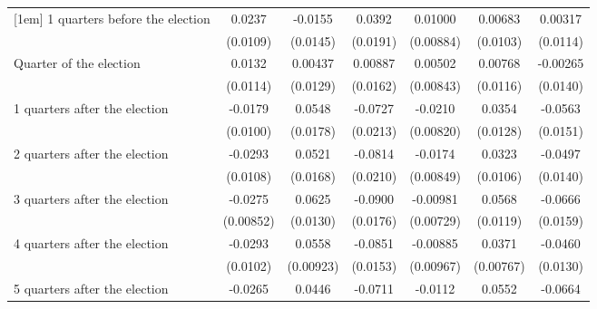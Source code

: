 \begin{table}[htbp]
\begin{tabular}{l*{6}{c}}
[1em]
 1 quarters before the election&      0.0237\sym{*}  &     -0.0155         &      0.0392\sym{*}  &     0.01000         &     0.00683         &     0.00317         \\
                    &    (0.0109)         &    (0.0145)         &    (0.0191)         &   (0.00884)         &    (0.0103)         &    (0.0114)         \\
[1em]
Quarter of the election&      0.0132         &     0.00437         &     0.00887         &     0.00502         &     0.00768         &    -0.00265         \\
                    &    (0.0114)         &    (0.0129)         &    (0.0162)         &   (0.00843)         &    (0.0116)         &    (0.0140)         \\
[1em]
 1 quarters after the election&     -0.0179         &      0.0548\sym{**} &     -0.0727\sym{***}&     -0.0210\sym{*}  &      0.0354\sym{**} &     -0.0563\sym{***}\\
                    &    (0.0100)         &    (0.0178)         &    (0.0213)         &   (0.00820)         &    (0.0128)         &    (0.0151)         \\
[1em]
 2 quarters after the election&     -0.0293\sym{**} &      0.0521\sym{**} &     -0.0814\sym{***}&     -0.0174\sym{*}  &      0.0323\sym{**} &     -0.0497\sym{***}\\
                    &    (0.0108)         &    (0.0168)         &    (0.0210)         &   (0.00849)         &    (0.0106)         &    (0.0140)         \\
[1em]
 3 quarters after the election&     -0.0275\sym{**} &      0.0625\sym{***}&     -0.0900\sym{***}&    -0.00981         &      0.0568\sym{***}&     -0.0666\sym{***}\\
                    &   (0.00852)         &    (0.0130)         &    (0.0176)         &   (0.00729)         &    (0.0119)         &    (0.0159)         \\
[1em]
 4 quarters after the election&     -0.0293\sym{**} &      0.0558\sym{***}&     -0.0851\sym{***}&    -0.00885         &      0.0371\sym{***}&     -0.0460\sym{***}\\
                    &    (0.0102)         &   (0.00923)         &    (0.0153)         &   (0.00967)         &   (0.00767)         &    (0.0130)         \\
[1em]
 5 quarters after the election&     -0.0265\sym{*}  &      0.0446\sym{**} &     -0.0711\sym{***}&     -0.0112         &      0.0552\sym{***}&     -0.0664\sym{***}\\

\end{tabular}
\end{table}
